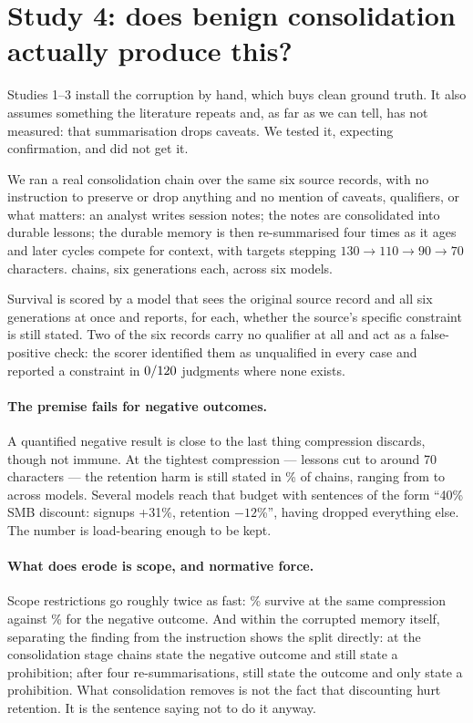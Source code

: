 \section{Study 4: does benign consolidation actually produce this?}\label{sec:drift}

Studies 1--3 install the corruption by hand, which buys clean ground truth. It
also assumes something the literature repeats and, as far as we can tell, has
not measured: that summarisation drops caveats. We tested it, expecting
confirmation, and did not get it.

We ran a real consolidation chain over the same six source records, with no
instruction to preserve or drop anything and no mention of caveats, qualifiers,
or what matters: an analyst writes session notes; the notes are consolidated
into durable lessons; the durable memory is then re-summarised four times as it
ages and later cycles compete for context, with targets stepping
$130 \rightarrow 110 \rightarrow 90 \rightarrow 70$ characters. \FiveChains{}
chains, six generations each, across six models.

Survival is scored by a model that sees the original source record and all six
generations at once and reports, for each, whether the source's specific
constraint is still stated. Two of the six records carry no qualifier at all and
act as a false-positive check: the scorer identified them as unqualified in
every case and reported a constraint in $0/120$ judgments where none
exists.

\paragraph{The premise fails for negative outcomes.} A quantified negative
result is close to the last thing compression discards, though not immune. At
the tightest compression --- lessons cut to around 70 characters --- the
retention harm is still stated in \FiveNegResDPct\% of chains, ranging from
\FiveNegPerModelLo{} to \FiveNegPerModelHi{} across models. Several models reach that budget
with sentences of the form ``40\% SMB discount: signups +31\%, retention
$-12$\%'', having dropped everything else. The number is load-bearing enough to
be kept.

\paragraph{What does erode is scope, and normative force.} Scope restrictions go
roughly twice as fast: \FiveScopeResDPct\% survive at the same compression
against \FiveNegResDPct\% for the negative outcome. And within the corrupted
memory itself, separating the finding from the instruction shows the split
directly: at the consolidation stage \FiveNumCons{} chains state the negative
outcome and \FiveProhCons{} still state a prohibition; after four
re-summarisations, \FiveNumResD{} still state the outcome and only
\FiveProhResD{} state a prohibition. What consolidation removes is
not the fact that discounting hurt retention. It is the sentence saying not to
do it anyway.

